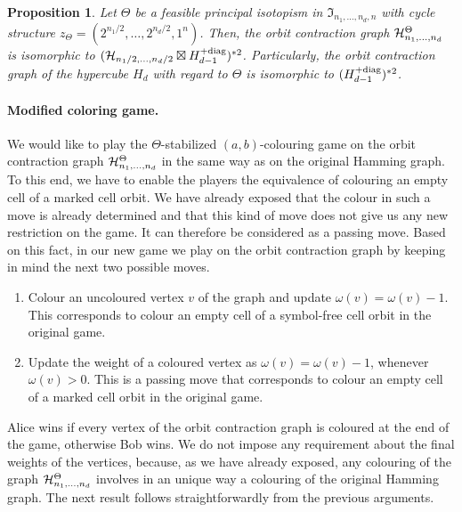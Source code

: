 \documentclass{article}
\newtheorem{prop}[thm]{Proposition}
\newcommand{\IZ}{\ensuremath{{\mathbb Z}}}
\begin{document}
\begin{prop}\label{mainprophypercube} Let $\Theta$ be a feasible principal isotopism in $\mathfrak{I}_{n_1,\ldots,n_d,n}$ with cycle structure $z_{\Theta}=\left(2^{n_1/2},\ldots,2^{n_d/2},1^n\right)$. Then, the orbit contraction graph ${\cal H}_{n_1,\ldots,n_d}^{\Theta}$ is isomorphic to $(\mathcal{H}_{n_1/2,\ldots,n_d/2}\boxtimes H_{d-1}^{+{\rm diag}})^{\ast 2}$. Particularly, the orbit contraction graph of the hypercube $H_d$ with regard to $\Theta$ is isomorphic to $(H_{d-1}^{+{\rm diag}})^{\ast 2}$.
\end{prop}


\paragraph{Modified coloring game.} We would like to play the $\Theta$-stabilized $(a,b)$-colouring game on the orbit contraction graph ${\cal H}_{n_1,\ldots,n_d}^{\Theta}$ in the same way as on the original Hamming graph. To this end, we have to enable the players the equivalence of colouring an empty cell of a marked cell orbit. We have already exposed that the colour in such a move is already determined and that this kind of move does not give us any new restriction on the game. It can therefore be considered as a passing move. Based on this fact, in our new game we play on the orbit contraction graph by keeping in mind the next two possible moves.
\begin{enumerate}[1.]
\item Colour an uncoloured vertex $v$ of the graph and update $\omega(v)=\omega(v)-1$. This corresponds to colour an empty cell of a symbol-free cell orbit in the original game.
\item Update the weight of a coloured vertex as $\omega(v)=\omega(v)-1$, whenever $\omega(v)>0$. This is a passing move that corresponds to colour an empty cell of a marked cell orbit in the original game.
\end{enumerate}
Alice wins if every vertex of the orbit contraction graph is coloured at the end of the game, otherwise Bob wins. We do not impose any requirement about the final weights of the vertices, because, as we have already exposed, any colouring of the graph ${\cal H}_{n_1,\ldots,n_d}^{\Theta}$ involves in an unique way a colouring of the original Hamming graph. The next result follows straightforwardly from the previous arguments.
\end{document}
